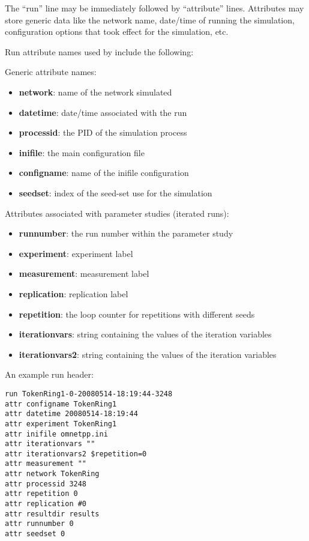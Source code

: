The ``run'' line may be immediately followed by ``attribute'' lines.
Attributes may store generic data like the network name, date/time of running
the simulation, configuration options that took effect for the simulation, etc.

Run attribute names used by {\opp} include the following:

Generic attribute names:

\begin{itemize}
    \item \textbf{network}: name of the network simulated
    \item \textbf{datetime}: date/time associated with the run
    \item \textbf{processid}: the PID of the simulation process
    \item \textbf{inifile}: the main configuration file
    \item \textbf{configname}: name of the inifile configuration
    \item \textbf{seedset}: index of the seed-set use for the simulation
\end{itemize}

Attributes associated with parameter studies (iterated runs):

\begin{itemize}
    \item \textbf{runnumber}: the run number within the parameter study
    \item \textbf{experiment}: experiment label
    \item \textbf{measurement}: measurement label
    \item \textbf{replication}: replication label
    \item \textbf{repetition}: the loop counter for repetitions with different seeds
    \item \textbf{iterationvars}: string containing the values of the iteration variables
    \item \textbf{iterationvars2}: string containing the values of the iteration variables
\end{itemize}


An example run header:

\begin{verbatim}
run TokenRing1-0-20080514-18:19:44-3248
attr configname TokenRing1
attr datetime 20080514-18:19:44
attr experiment TokenRing1
attr inifile omnetpp.ini
attr iterationvars ""
attr iterationvars2 $repetition=0
attr measurement ""
attr network TokenRing
attr processid 3248
attr repetition 0
attr replication #0
attr resultdir results
attr runnumber 0
attr seedset 0
\end{verbatim}



